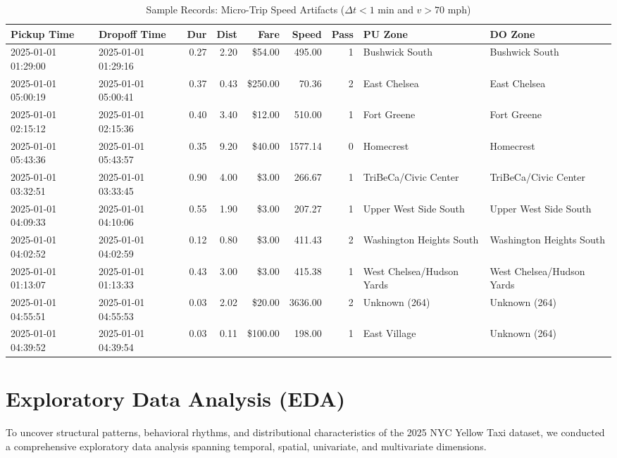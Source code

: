 \documentclass[11pt,a4paper]{article}
\begin{document}
\begin{table}[htbp]
\centering
\caption{Sample Records: Micro-Trip Speed Artifacts ($\Delta t < 1$ min and $v > 70$ mph)}
\label{tab:sample_microtrips}
\tiny
\begin{tabularx}{\textwidth}{l l r r r r r X X}
\toprule
\textbf{Pickup Time} & \textbf{Dropoff Time} & \textbf{Dur} & \textbf{Dist} & \textbf{Fare} & \textbf{Speed} & \textbf{Pass} & \textbf{PU Zone} & \textbf{DO Zone} \\
\midrule
2025-01-01 01:29:00 & 2025-01-01 01:29:16 & 0.27 & 2.20 & \$54.00 & 495.00 & 1 & Bushwick South & Bushwick South \\
2025-01-01 05:00:19 & 2025-01-01 05:00:41 & 0.37 & 0.43 & \$250.00 & 70.36 & 2 & East Chelsea & East Chelsea \\
2025-01-01 02:15:12 & 2025-01-01 02:15:36 & 0.40 & 3.40 & \$12.00 & 510.00 & 1 & Fort Greene & Fort Greene \\
2025-01-01 05:43:36 & 2025-01-01 05:43:57 & 0.35 & 9.20 & \$40.00 & 1577.14 & 0 & Homecrest & Homecrest \\
2025-01-01 03:32:51 & 2025-01-01 03:33:45 & 0.90 & 4.00 & \$3.00 & 266.67 & 1 & TriBeCa/Civic Center & TriBeCa/Civic Center \\
2025-01-01 04:09:33 & 2025-01-01 04:10:06 & 0.55 & 1.90 & \$3.00 & 207.27 & 1 & Upper West Side South & Upper West Side South \\
2025-01-01 04:02:52 & 2025-01-01 04:02:59 & 0.12 & 0.80 & \$3.00 & 411.43 & 2 & Washington Heights South & Washington Heights South \\
2025-01-01 01:13:07 & 2025-01-01 01:13:33 & 0.43 & 3.00 & \$3.00 & 415.38 & 1 & West Chelsea/Hudson Yards & West Chelsea/Hudson Yards \\
2025-01-01 04:55:51 & 2025-01-01 04:55:53 & 0.03 & 2.02 & \$20.00 & 3636.00 & 2 & Unknown (264) & Unknown (264) \\
2025-01-01 04:39:52 & 2025-01-01 04:39:54 & 0.03 & 0.11 & \$100.00 & 198.00 & 1 & East Village & Unknown (264) \\
\bottomrule
\end{tabularx}
\end{table}

\section{Exploratory Data Analysis (EDA)}

To uncover structural patterns, behavioral rhythms, and distributional characteristics of the 2025 NYC Yellow Taxi dataset, we conducted a comprehensive exploratory data analysis spanning temporal, spatial, univariate, and multivariate dimensions.
\end{document}
